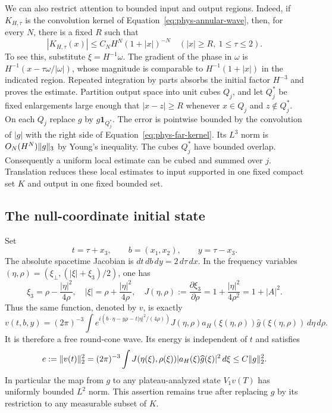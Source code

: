We can also restrict attention to bounded input and output regions.
Indeed, if $K_{H,\tau}$ is the convolution kernel of
Equation~\eqref{eq:phys-annular-wave}, then, for every $N$, there is a
fixed $R$ such that
\begin{equation}
 |K_{H,\tau}(x)|\le C_N H^N(1+|x|)^{-N}
 \quad (|x|\ge R,\ 1\le\tau\le2).
 \label{eq:phys-far-kernel}
\end{equation}
To see this, substitute $\xi=H^{-1}\omega$.  The gradient of the phase
in $\omega$ is $H^{-1}(x-\tau\omega/|\omega|)$, whose magnitude is
comparable to $H^{-1}(1+|x|)$ in the indicated region.  Repeated
integration by parts absorbs the initial factor $H^{-3}$ and proves
the estimate.  Partition output space into unit cubes $Q_j$, and let
$Q_j^*$ be fixed enlargements large enough that $|x-z|\ge R$ whenever
$x\in Q_j$ and $z\notin Q_j^*$.  On each $Q_j$ replace $g$ by
$g\mathbf1_{Q_j^*}$.  The error is pointwise bounded by the convolution
of $|g|$ with the right side of
Equation~\eqref{eq:phys-far-kernel}.  Its $L^3$ norm is $O_N(H^N)\lVert g\rVert_3$
by Young's inequality.  The cubes $Q_j^*$ have bounded overlap.
Consequently a uniform local estimate can be cubed and summed over
$j$.  Translation reduces these local estimates to input supported
in one fixed compact set $K$ and output in one fixed bounded set.

\subsection{The null-coordinate initial state}

Set
\begin{equation}
 t=\tau+x_3,\qquad b=(x_1,x_2),\qquad y=\tau-x_3.
 \label{eq:phys-null-coordinates}
\end{equation}
The absolute spacetime Jacobian is
$dt\,db\,dy=2\,d\tau\,dx$.  In the frequency variables
$(\eta,\rho)=(\xi_\perp,(|\xi|+\xi_3)/2)$, one has
\begin{equation}
 \xi_3=\rho-\frac{|\eta|^2}{4\rho},\quad
 |\xi|=\rho+\frac{|\eta|^2}{4\rho},\quad
 J(\eta,\rho):=\frac{\partial\xi_3}{\partial\rho}
       =1+\frac{|\eta|^2}{4\rho^2}=1+|A|^2.
 \label{eq:phys-frequency-change}
\end{equation}
Thus the same function, denoted by $v$, is exactly
\begin{equation}
 v(t,b,y)=(2\pi)^{-3}\int
 e^{i(b\cdot\eta-y\rho-t|\eta|^2/(4\rho))}
 J(\eta,\rho)a_H(\xi(\eta,\rho))
 \widehat g(\xi(\eta,\rho))\,d\eta\,d\rho.
 \label{eq:phys-round-state}
\end{equation}
It is therefore a free round-cone wave.  Its energy is independent of
$t$ and satisfies
\begin{equation}
 e:=\lVert v(t)\rVert_2^2
 =(2\pi)^{-3}\int J(\eta(\xi),\rho(\xi))
          |a_H(\xi)\widehat g(\xi)|^2\,d\xi
 \le C\lVert g\rVert_2^2.
 \label{eq:phys-energy}
\end{equation}
In particular the map from $g$ to any plateau-analyzed state
$V_1v(T)$ has uniformly bounded $L^2$ norm.  This assertion remains
true after replacing $g$ by its restriction to any measurable subset
of $K$.

